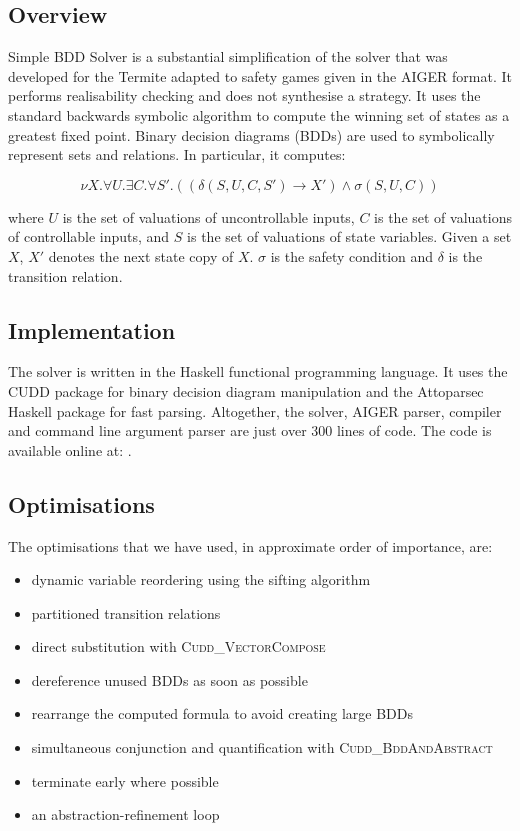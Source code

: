 \subsection{Overview}
Simple BDD Solver is a substantial simplification of the solver that was developed for the Termite adapted to safety games given in the AIGER format. It performs realisability checking and does not synthesise a strategy. It uses the standard backwards symbolic algorithm to compute the winning set of states as a greatest fixed point. Binary decision diagrams (BDDs) are used to symbolically represent sets and relations. In particular, it computes:

\begin{equation}
\label{eqn:mu}
\nu X. \forall U. \exists C. \forall S'. ((\delta(S, U, C, S') \rightarrow X') \wedge \sigma(S, U, C))
\end{equation}

\noindent where $U$ is the set of valuations of uncontrollable inputs, $C$ is the set of valuations of controllable inputs, and $S$ is the set of valuations of state variables. Given a set $X$, $X'$ denotes the next state copy of $X$. $\sigma$ is the safety condition and $\delta$ is the transition relation.

\subsection{Implementation}
The solver is written in the Haskell functional programming language. It uses the CUDD \cite{cudd} package for binary decision diagram manipulation and the Attoparsec Haskell package for fast parsing. Altogether, the solver, AIGER parser, compiler and command line argument parser are just over 300 lines of code. The code is available online at: .

\subsection{Optimisations}
\label{sec:syntcomp_optimisations}

The optimisations that we have used, in approximate order of importance, are:
\begin{itemize}
    \item dynamic variable reordering using the sifting algorithm \cite{Rudell_1993}
    \item partitioned transition relations \cite{Burch_91}
    \item direct substitution with \textsc{Cudd\_VectorCompose}
    \item dereference unused BDDs as soon as possible
    \item rearrange the computed formula to avoid creating large BDDs
    \item simultaneous conjunction and quantification with \textsc{Cudd\_BddAndAbstract}
    \item terminate early where possible
    \item an abstraction-refinement loop
\end{itemize}

